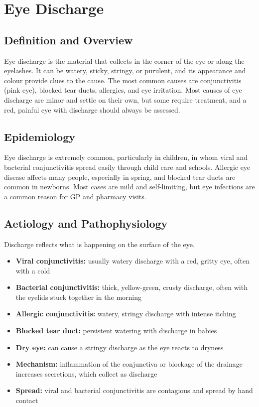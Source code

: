 \chapter{Eye Discharge}

\section*{Definition and Overview}
Eye discharge is the material that collects in the corner of the eye or along the eyelashes. It can be watery, sticky, stringy, or purulent, and its appearance and colour provide clues to the cause. The most common causes are conjunctivitis (pink eye), blocked tear ducts, allergies, and eye irritation. Most causes of eye discharge are minor and settle on their own, but some require treatment, and a red, painful eye with discharge should always be assessed.

\section*{Epidemiology}
Eye discharge is extremely common, particularly in children, in whom viral and bacterial conjunctivitis spread easily through child care and schools. Allergic eye disease affects many people, especially in spring, and blocked tear ducts are common in newborns. Most cases are mild and self-limiting, but eye infections are a common reason for GP and pharmacy visits.

\section*{Aetiology and Pathophysiology}
Discharge reflects what is happening on the surface of the eye.
\begin{itemize}
    \item \textbf{Viral conjunctivitis:} usually watery discharge with a red, gritty eye, often with a cold
    \item \textbf{Bacterial conjunctivitis:} thick, yellow-green, crusty discharge, often with the eyelids stuck together in the morning
    \item \textbf{Allergic conjunctivitis:} watery, stringy discharge with intense itching
    \item \textbf{Blocked tear duct:} persistent watering with discharge in babies
    \item \textbf{Dry eye:} can cause a stringy discharge as the eye reacts to dryness
    \item \textbf{Mechanism:} inflammation of the conjunctiva or blockage of the drainage increases secretions, which collect as discharge
    \item \textbf{Spread:} viral and bacterial conjunctivitis are contagious and spread by hand contact
\end{itemize}

